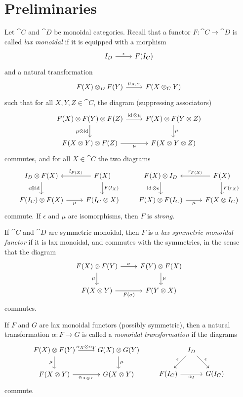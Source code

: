 \chapter{Preliminaries}

Let $\cat{C}$ and $\cat{D}$ be monoidal categories. Recall that a functor $F\colon\cat{C}\to\cat{D}$ is called \emph{lax monoidal} if it is equipped with a morphism
\[
\begin{tikzcd}
	I_D \rar{\epsilon} & F(I_C)
\end{tikzcd}
\]
and a natural transformation
\[
\begin{tikzcd}
	F(X) \otimes_D F(Y) \rar{\mu_{X,Y}} & F(X\otimes_C Y)
\end{tikzcd}
\]
such that for all $X,Y,Z\in\cat{C}$, the diagram (suppressing associators)
\[
\begin{tikzcd}
	F(X)\otimes F(Y) \otimes F(Z)
		\rar{\id\otimes\mu}
		\dar[swap]{\mu\otimes\id}
	& F(X)\otimes F(Y\otimes Z)
		\dar{\mu} \\
	F(X\otimes Y)\otimes F(Z)
		\rar[swap]{\mu}
	& F(X\otimes Y\otimes Z)
\end{tikzcd}
\]
commutes, and for all $X\in\cat{C}$ the two diagrams
\[
\begin{tikzcd}
	I_D\otimes F(X)
		\dar[swap]{\epsilon\otimes\id}
	& F(X)
		\lar[swap]{l_{F(X)}}
		\dar{F(l_X)} \\
	F(I_C)\otimes F(X)
		\rar[swap]{\mu}
	& F(I_C\otimes X)
\end{tikzcd}
\qquad
\begin{tikzcd}
	F(X) \otimes I_D
		\dar[swap]{\id\otimes\epsilon}
	& F(X)
		\lar[swap]{r_{F(X)}}
		\dar{F(r_X)} \\
	F(X)\otimes F(I_C)
		\rar[swap]{\mu}
	& F(X\otimes I_C)
\end{tikzcd}
\]
commute. If $\epsilon$ and $\mu$ are isomorphisms, then $F$ is \emph{strong}.

If $\cat{C}$ and $\cat{D}$ are symmetric monoidal, then $F$ is a \emph{lax symmetric monoidal functor} if it is lax monoidal, and commutes with the symmetries, in the sense that the diagram
\[
\begin{tikzcd}
	F(X)\otimes F(Y)
		\rar{\sigma}
		\dar[swap]{\mu}
	& F(Y)\otimes F(X)
		\dar{\mu} \\
	F(X\otimes Y)
		\rar[swap]{F(\sigma)}
	& F(Y\otimes X)
\end{tikzcd}
\]
commutes.

If $F$ and $G$ are lax monoidal functors (possibly symmetric), then a natural transformation $\alpha\colon F\to G$ is called a \emph{monoidal transformation} if the diagrams
\[
\begin{tikzcd}
	F(X)\otimes F(Y)
		\rar{\alpha_X\otimes\alpha_Y}
		\dar[swap]{\mu}
	& G(X)\otimes G(Y)
		\dar{\mu} \\
	F(X\otimes Y)
		\rar[swap]{\alpha_{X\otimes Y}}
	& G(X\otimes Y)
\end{tikzcd}
\qquad
\begin{tikzcd}[column sep=tiny]
	{} & I_D \dlar[swap]{\epsilon} \drar{\epsilon} & \\
	F(I_C) \ar{rr}[swap]{\alpha_I} && G(I_C)
\end{tikzcd}
\]
commute.

